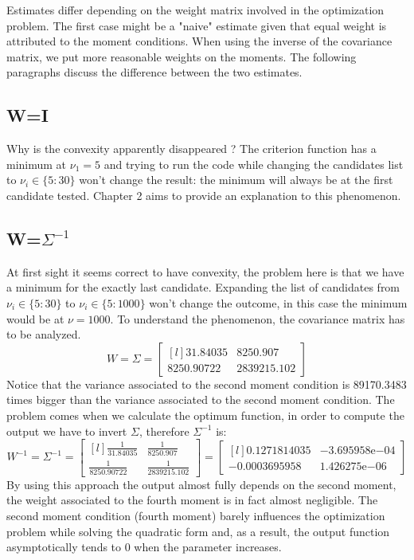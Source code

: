 Estimates differ depending on the weight matrix involved in the optimization problem. The first case might be a "naive" estimate given that equal weight is attributed to the moment conditions.  When using the inverse of the covariance matrix, we put more reasonable weights on the moments. The following paragraphs discuss the difference between the two estimates.


\subsection{W=I}
Why is the convexity apparently disappeared ? The criterion function has a minimum at $\nu_1=5$ and trying to run the code while changing the candidates list to $\nu_i \in \{5:30\}$ won't change the result: the minimum will always be at the first candidate tested. Chapter 2 aims to provide an explanation to this phenomenon.

\subsection{W=$\Sigma^{-1}$}
At first sight it seems correct to have convexity, the problem here is that we have a minimum for the exactly last candidate. Expanding the list of candidates from $\nu_i \in \{5:30\}$ to $\nu_i \in \{5:1000\}$ won't change the outcome, in this case the minimum would be at $\nu=1000$. To understand the phenomenon, the covariance matrix has to be analyzed.
\begin{equation*}
    W=\Sigma=
    \begin{bmatrix}[l]
        31.84035    &8250.907 \\
        8250.90722  &2839215.102
        \end{bmatrix}
\end{equation*}
Notice that the variance associated to the second moment condition is 89170.3483 times bigger than the variance associated to the second moment condition. The problem comes when we calculate the optimum function, in order to compute the output we have to invert $\Sigma$, therefore $\Sigma^{-1}$ is:
\begin{equation*}
    W^{-1}=\Sigma^{-1}=
    \begin{bmatrix}[l]
        \frac{1}{31.84035}    &\frac{1}{8250.907} \\
        \frac{1}{8250.90722}  &\frac{1}{2839215.102}
        \end{bmatrix}=
    \begin{bmatrix}[l]
        0.1271814035    &-3.695958\mathrm{e}{-04} \\
        -0.0003695958    &1.426275\mathrm{e}{-06}
    \end{bmatrix}
\end{equation*}
By using this approach the output almost fully depends on the second moment, the weight associated to the fourth moment is in fact almost negligible. The second moment condition (fourth moment) barely influences the optimization problem while solving the quadratic form and, as a result, the output function asymptotically tends to 0 when the parameter increases.




